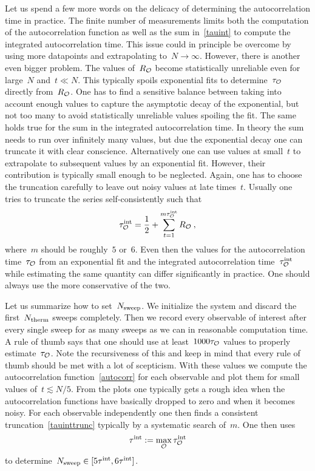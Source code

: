Let us spend a few more words on the delicacy of determining the autocorrelation
time in practice. The finite number of measurements limits both the computation
of the autocorrelation function as well as the sum in~\eqref{tauint} to compute
the integrated autocorrelation time. This issue could in principle be overcome
by using more datapoints and extrapolating to~$N\to \infty$. However, there is
another even bigger problem. The values of~$R_{\mathcal{O}}$ become statistically
unreliable even for large~$N$ and~$t\ll N$. This typically spoils exponential
fits to determine~$\tau_{\mathcal{O}}$ directly from~$R_{\mathcal{O}}$. One has to find a
sensitive balance between taking into account enough values to capture the
asymptotic decay of the exponential, but not too many to avoid statistically
unreliable values spoiling the fit. The same holds true for the sum in the
integrated autocorrelation time. In theory the sum needs to run over infinitely
many values, but due the exponential decay one can truncate it with clear
conscience.  Alternatively one can use values at small~$t$ to extrapolate to
subsequent values by an exponential fit. However, their contribution is
typically small enough to be neglected.  Again, one has to choose the truncation
carefully to leave out noisy values at late times~$t$. Usually one tries to
truncate the series self-consistently such that
%
\begin{equation}\label{tauinttrunc}
  \tau^{\mathrm{int}}_{\mathcal{O}} = \frac{1}{2} + \sum_{t=1}^{m \tau^{\mathrm{int}}_{\mathcal{O}}} R_{\mathcal{O}}\:,
\end{equation}
%
where~$m$ should be roughly~$5$ or~$6$. Even then the values for the
autocorrelation time~$\tau_{\mathcal{O}}$ from an exponential fit and the integrated
autocorrelation time~$\tau^{\mathrm{int}}_{\mathcal{O}}$ while estimating the same quantity can
differ significantly in practice. One should always use the more conservative of
the two.

Let us summarize how to set~$N_{\mathrm{sweep}}$. We initialize the system and discard the
first~$N_{\mathrm{therm}}$ sweeps completely. Then we record every observable of interest
after every single sweep for as many sweeps as we can in reasonable computation
time. A rule of thumb says that one should use at least~$1000 \tau_{\mathcal{O}}$ values
to properly estimate~$\tau_{\mathcal{O}}$. Note the recursiveness of this  and keep in
mind that every rule of thumb should be met with a lot of scepticism. With these
values we compute the autocorrelation function~\eqref{autocorr} for each
observable and plot them for small values of~$t \lesssim N/5$. From the plots
one typically gets a rough idea when the autocorrelation functions have
basically dropped to zero and when it becomes noisy. For each observable
independently one then finds a consistent truncation~\eqref{tauinttrunc}
typically by a systematic search of~$m$. One then uses
%
\begin{equation}
  \tau^{\mathrm{int}} := \max_{\mathcal{O}} \tau^{\mathrm{int}}_{\mathcal{O}}
\end{equation}
%
to determine~$N_{\mathrm{sweep}} \in  [5 \tau^{\mathrm{int}}, 6 \tau^{\mathrm{int}}]$.

